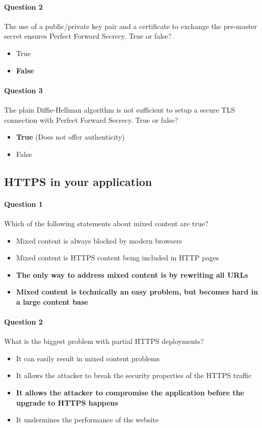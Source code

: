 \documentclass[titlepage]{article}
\begin{document}
    \paragraph{Question 2} The use of a public/private key pair and a certificate to exchange the pre-master secret ensures Perfect Forward Secrecy. True or false?
    \begin{itemize}
        \item True
        \item \textbf{False} \checkmark
    \end{itemize}
    \paragraph{Question 3} The plain Diffie-Hellman algorithm is not sufficient to setup a secure TLS connection with Perfect Forward Secrecy. True or false?
    \begin{itemize}
        \item \textbf{True} \checkmark (Does not offer authenticity)
        \item False
    \end{itemize}
    \subsection{HTTPS in your application}
    \paragraph{Question 1} Which of the following statements about mixed content are true?
    \begin{itemize}
        \item Mixed content is always blocked by modern browsers
        \item Mixed content is HTTPS content being included in HTTP pages
        \item \textbf{The only way to address mixed content is by rewriting all URLs} \checkmark
        \item \textbf{Mixed content is technically an easy problem, but becomes hard in a large content base} \checkmark
    \end{itemize}
    \paragraph{Question 2} What is the biggest problem with partial HTTPS deployments?
    \begin{itemize}
        \item It can easily result in mixed content problems
        \item It allows the attacker to break the security properties of the HTTPS traffic
        \item \textbf{It allows the attacker to compromise the application before the upgrade to HTTPS happens} \checkmark
        \item It undermines the performance of the website
    \end{itemize}
\end{document}
